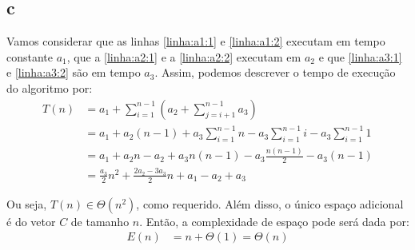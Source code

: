 \itemdsep
\subsection{c}

Vamos considerar que as linhas \ref{linha:a1:1} e \ref{linha:a1:2} executam em tempo constante $a_1$, que a \ref{linha:a2:1} e a \ref{linha:a2:2} executam em $a_2$ e que \ref{linha:a3:1} e \ref{linha:a3:2} são em tempo $a_3$. Assim, podemos descrever o tempo de execução do algoritmo por:
\begin{align*}
    T(n) &= a_1 + \sum_{i = 1}^{n - 1}\left(a_2 + \sum_{j = i + 1}^{n - 1} a_3\right) \\
    &= a_1 + a_2 (n - 1) + a_3 \sum_{i = 1}^{n - 1} n - a_3 \sum_{i = 1}^{n - 1} i - a_3 \sum_{i = 1}^{n - 1} 1 \\
    &= a_1 + a_2 n - a_2 + a_3 n (n - 1) - a_3 \frac{n (n - 1)}{2} - a_3 (n - 1) \\
    &= \frac{a_3}{2} n^2 + \frac{2 a_2 - 3 a_3}{2} n + a_1 - a_2 + a_3
\end{align*}

Ou seja, $T(n) \in \Theta\left(n^2\right)$, como requerido. Além disso, o único espaço adicional é do vetor $C$ de tamanho $n$. Então, a complexidade de espaço pode será dada por:
\begin{align*}
    E(n) &= n + \Theta(1) = \Theta(n)
\end{align*}
